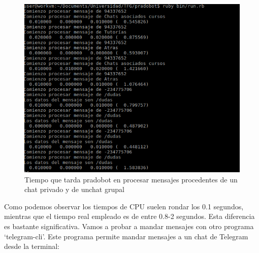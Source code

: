 \begin{figure}[H] %
\centering
\includegraphics[scale=0.6]{imagenes/random/rend2.png}  %
\caption{Tiempo que tarda pradobot en procesar mensajes procedentes de un chat privado y de unchat grupal}\label{figura94}
\end{figure}

Como podemos observar los tiempos de CPU suelen rondar los 0.1 segundos, mientras que el tiempo real empleado es de entre 0.8-2 segundos. Esta diferencia es bastante significativa. Vamos a probar a mandar mensajes con otro programa  \enquote*{telegram-cli}. Este programa permite mandar mensajes a un chat de Telegram desde la terminal:


